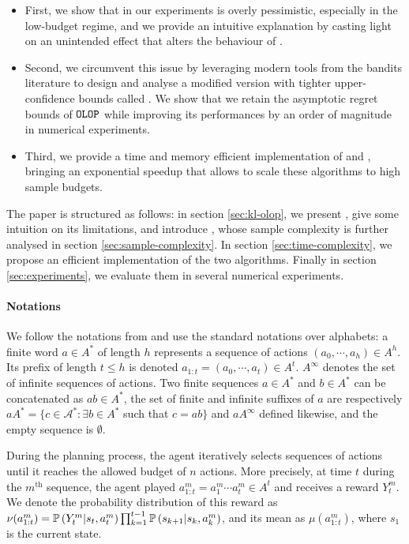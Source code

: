 \begin{itemize}
	\item First, we show that in our experiments \OLOP is overly pessimistic, especially in the low-budget regime, and we provide an intuitive explanation by casting light on an unintended effect that alters the behaviour of \OLOP.
	\item Second, we circumvent this issue by leveraging modern tools from the bandits literature to design and analyse a modified version with tighter upper-confidence bounds called \KLOLOP. We show that we retain the asymptotic regret bounds of $\texttt{OLOP}$ while improving its performances by an order of magnitude in numerical experiments.
	\item Third, we provide a time and memory efficient implementation of \OLOP and \KLOLOP, bringing an exponential speedup that allows to scale these algorithms to high sample budgets.
\end{itemize}

The paper is structured as follows: in section \ref{sec:kl-olop}, we present \OLOP, give some intuition on its limitations, and introduce \KLOLOP, whose sample complexity is further analysed in section \ref{sec:sample-complexity}. In section \ref{sec:time-complexity}, we propose an efficient implementation of the two algorithms. Finally in section \ref{sec:experiments}, we evaluate them in several numerical experiments.

\paragraph{Notations}
We follow the notations from \citep{Bubeck2010} and use the standard notations over alphabets: a finite word $a \in A^*$ of length $h$ represents a sequence of actions $(a_0, \cdots, a_h) \in A^h$. Its prefix of length $t \leq h$ is denoted $a_{1:t} = (a_0,\cdots,a_t) \in A^t$. $A^\infty$ denotes the set of infinite sequences of actions. Two finite sequences $a\in A^*$ and $b\in A^*$ can be concatenated as $ab\in A^*$, the set of finite and infinite suffixes of $a$ are respectively $a A^* = \{c\in\mathcal{A}^*: \exists b\in A^*$ such that $c=ab\}$ and $aA^\infty$ defined likewise, and the empty sequence is $\emptyset$.

During the planning process, the agent iteratively selects sequences of actions until it reaches the allowed budget of $n$ actions. More precisely, at time $t$ during the $m^{\text{th}}$ sequence, the agent played $a^m_{1:t} = a^m_1 \cdots a^m_t \in A^t$ and receives a reward $Y_t^m$. We denote the probability distribution of this reward as $\nu(a_{1:t}^m) = \mathbb{P}\left(Y_t^m | s_t, a^m_t\right) \prod_{k=1}^{t-1} \mathbb{P}\left(s_{k+1} | s_{k}, a_{k}^m\right)$, and its mean as $\mu(a_{1:t}^m)$, where $s_1$ is the current state.

